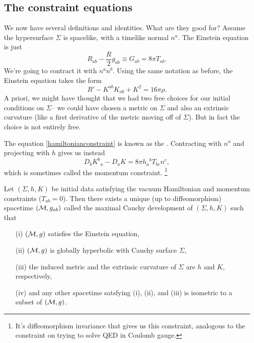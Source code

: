 \subsection*{The constraint equations} We now have several definitions and identities. What are they good for? Assume the hypersurface $\Sigma$ is spacelike, with a timelike normal $n^a$. The Einstein equation is just
\begin{equation*}
    R_{ab}-\frac{R}{2}g_{ab}\equiv G_{ab}=8\pi T_{ab}.
\end{equation*}
We're going to contract it with $n^a n^b$. Using the same notation as before, the Einstein equation takes the form
\begin{equation}\label{hamiltonianconstraint}
    R'-K^{ab}K_{ab} +K^2 = 16\pi \rho.
\end{equation}
A priori, we might have thought that we had two free choices for our initial conditions on $\Sigma$-- we could have chosen a metric on $\Sigma$ and also an extrinsic curvature (like a first derivative of the metric moving off of $\Sigma$). But in fact the choice is not entirely free.

The equation \ref{hamiltonianconstraint} is known as the . Contracting with $n^a$ and projecting with $h$ gives us instead
\begin{equation}
    D_b K^b{}_a - D_a K = 8\pi h_a{}^b T_{bc} n^c,
\end{equation}
which is sometimes called the momentum constraint.%
    \footnote{It's diffeomorphism invariance that gives us this constraint, analogous to the constraint on trying to solve QED in Coulomb gauge.}
    
\begin{thm}
    Let $(\Sigma, h, K)$ be initial data satisfying the vacuum Hamiltonian and momentum constraints ($T_{ab}=0$). Then there exists a unique (up to diffeomorphism) spacetime $(\mathcal{M}, g_{ab})$ called the maximal Cauchy development of $(\Sigma,h,K)$ such that
    \begin{enumerate}
        \item[(i)] $(\mathcal{M},g)$ satisfies the Einstein equation,
        \item[(ii)] $(\mathcal{M}, g)$ is globally hyperbolic with Cauchy surface $\Sigma$,
        \item[(iii)] the induced metric and the extrinsic curvature of $\Sigma$ are $h$ and $K$, respectively,
        \item[(iv)] and any other spacetime satsfying (i), (ii), and (iii) is isometric to a subset of $(\mathcal{M},g)$.
    \end{enumerate}
\end{thm}

